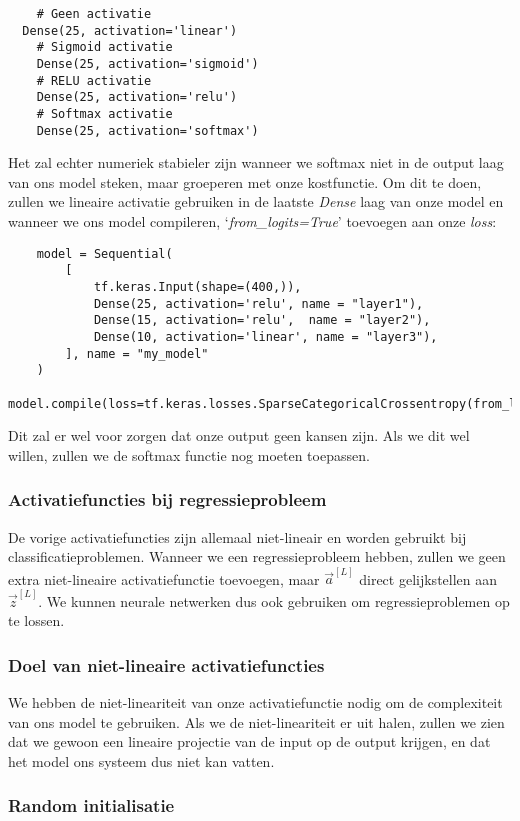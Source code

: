 \begin{lstlisting}
	# Geen activatie
  Dense(25, activation='linear')
	# Sigmoid activatie
	Dense(25, activation='sigmoid')
	# RELU activatie
	Dense(25, activation='relu')
	# Softmax activatie
	Dense(25, activation='softmax')
\end{lstlisting}
\noindent
Het zal echter numeriek stabieler zijn wanneer we softmax niet in de output laag van ons model steken, maar groeperen met onze kostfunctie. Om dit te doen, zullen we lineaire activatie gebruiken in de laatste \textit{Dense} laag van onze model en wanneer we ons model compileren, `\textit{from\_logits=True}' toevoegen aan onze \textit{loss}:
\begin{lstlisting}
	model = Sequential(
	    [
	        tf.keras.Input(shape=(400,)),     
	        Dense(25, activation='relu', name = "layer1"),
	        Dense(15, activation='relu',  name = "layer2"),   
	        Dense(10, activation='linear', name = "layer3"),  
	    ], name = "my_model"
	)
	model.compile(loss=tf.keras.losses.SparseCategoricalCrossentropy(from_logits=True))
\end{lstlisting}
\noindent
Dit zal er wel voor zorgen dat onze output geen kansen zijn. Als we dit wel willen, zullen we de softmax functie nog moeten toepassen.

\subsubsection{Activatiefuncties bij regressieprobleem}

De vorige activatiefuncties zijn allemaal niet-lineair en worden gebruikt bij classificatieproblemen. Wanneer we een regressieprobleem hebben, zullen we geen extra niet-lineaire activatiefunctie toevoegen, maar $\vec{a}^{[L]}$ direct gelijkstellen aan $\vec{z}^{[L]}$. We kunnen neurale netwerken dus ook gebruiken om regressieproblemen op te lossen. 

\subsubsection{Doel van niet-lineaire activatiefuncties}

We hebben de niet-lineariteit van onze activatiefunctie nodig om de complexiteit van ons model te gebruiken. Als we de niet-lineariteit er uit halen, zullen we zien dat we gewoon een lineaire projectie van de input op de output krijgen, en dat het model ons systeem dus niet kan vatten.

\subsubsection{Random initialisatie}

